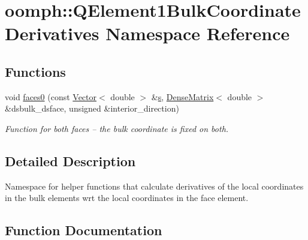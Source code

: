 \hypertarget{namespaceoomph_1_1QElement1BulkCoordinateDerivatives}{}\section{oomph\+:\+:Q\+Element1\+Bulk\+Coordinate\+Derivatives Namespace Reference}
\label{namespaceoomph_1_1QElement1BulkCoordinateDerivatives}
\subsection*{Functions}
\begin{DoxyCompactItemize}
\item 
void \hyperlink{namespaceoomph_1_1QElement1BulkCoordinateDerivatives_a8ee13e6433c5bcd6c750ad8f142ef273}{faces0} (const \hyperlink{classoomph_1_1Vector}{Vector}$<$ double $>$ \&\hyperlink{cfortran_8h_ab7123126e4885ef647dd9c6e3807a21c}{s}, \hyperlink{classoomph_1_1DenseMatrix}{Dense\+Matrix}$<$ double $>$ \&dsbulk\+\_\+dsface, unsigned \&interior\+\_\+direction)
\begin{DoxyCompactList}\small\item\em Function for both faces -- the bulk coordinate is fixed on both. \end{DoxyCompactList}\end{DoxyCompactItemize}


\subsection{Detailed Description}
Namespace for helper functions that calculate derivatives of the local coordinates in the bulk elements wrt the local coordinates in the face element. 

\subsection{Function Documentation}
\mbox{\label{namespaceoomph_1_1QElement1BulkCoordinateDerivatives_a8ee13e6433c5bcd6c750ad8f142ef273}} 
